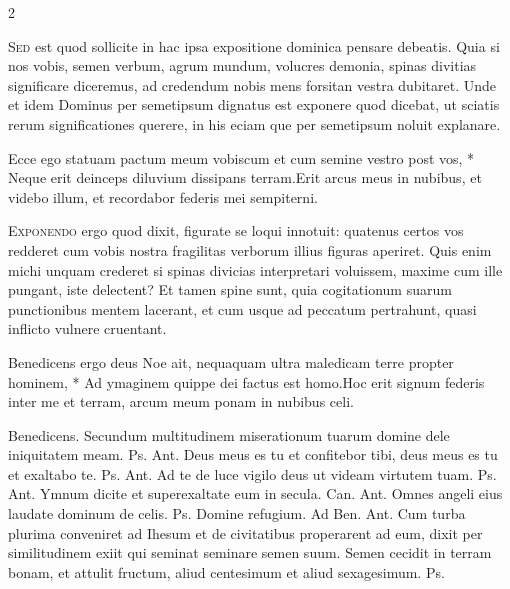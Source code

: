 \begin{multicols*}{2}
\begin{responsory}
\end{responsory}%
\lettrine[lines=2]{\zallmancaps \color{Blue} S}{ed} est quod sollicite in hac ipsa expositione dominica pensare debeatis. Quia si nos vobis, semen verbum, agrum mundum, volucres demonia, spinas divitias significare diceremus, ad credendum nobis mens forsitan vestra dubitaret. Unde et idem Dominus per semetipsum dignatus est exponere quod dicebat, ut sciatis rerum significationes querere, in his eciam que per semetipsum noluit explanare.
\begin{responsory}
{Ecce ego statuam pactum meum vobiscum et cum semine vestro post vos, * Neque erit deinceps diluvium dissipans terram.}{Erit arcus meus in nubibus, et videbo illum, et recordabor federis mei sempiterni.}
\end{responsory}%
\lettrine[lines=2]{\zallmancaps \color{Red} E}{xponendo} ergo quod dixit, figurate se loqui innotuit: quatenus certos vos redderet cum vobis nostra fragilitas verborum illius figuras aperiret. Quis enim michi unquam crederet si spinas divicias interpretari voluissem, maxime cum ille pungant, iste delectent? Et tamen spine sunt, quia cogitationum suarum punctionibus mentem lacerant, et cum usque ad peccatum pertrahunt, quasi inflicto vulnere cruentant.
\begin{responsory-doxology}
{Benedicens ergo deus Noe ait, nequaquam ultra maledicam terre propter hominem, * Ad ymaginem quippe dei factus est homo.}{Hoc erit signum federis inter me et terram, arcum meum ponam in nubibus celi.}
\end{responsory-doxology}%
Benedicens.
 Secundum multitudinem miserationum tuarum domine dele iniquitatem meam. {\color{Red} Ps.}  {\color{Red} Ant.} Deus meus es tu et confitebor tibi, deus meus es tu et exaltabo te. {\color{Red} Ps.}  {\color{Red} Ant.} Ad te de luce vigilo deus ut videam virtutem tuam. {\color{Red} Ps.}  {\color{Red} Ant.} Ymnum dicite et superexaltate eum in secula. {\color{Red} Can.}  {\color{Red} Ant.} Omnes angeli eius laudate dominum de celis. {\color{Red} Ps.}  \V Domine refugium. {\color{Red} Ad Ben. Ant.} Cum turba plurima conveniret ad Ihesum et de civitatibus properarent ad eum, dixit per similitudinem exiit qui seminat seminare semen suum.
 Semen cecidit in terram bonam, et attulit fructum, aliud centesimum et aliud sexagesimum. {\color{Red} Ps.}

\end{multicols*}

